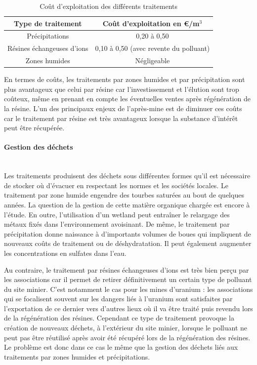 \documentclass{article}
\begin{document}
\begin{table}[H]
    \centering
   \caption{Coût d'exploitation des différents traitements \cite{schick_les_2020}}
    \begin{tabular}{ |c |c |}
        \hline
         \textbf{Type de traitement} & \textbf{Coût d’exploitation en \euro{}/m$^3$} \\ 
         \hline
         Précipitations & 0,20 à 0,50 \\ 
         \hline
         Résines échangeuses d’ions & 0,10 à 0,50 (avec revente du polluant)  \\
         \hline
        Zones humides & Négligeable  \\
         \hline
    \end{tabular}
\label{tab:cout_exploitation_traitements}
\end{table}

En termes de coûts, les traitements par zones humides et par précipitation sont plus avantageux que celui par résine car l’investissement et l’élution sont trop coûteux, même en prenant en compte les éventuelles ventes après régénération de la résine. L’un des principaux enjeux de l’après-mine est de diminuer ces coûts car le traitement par résine est très avantageux lorsque la substance d'intérêt peut être récupérée.

\paragraph{Gestion des déchets \\ \\}

Les traitements produisent des déchets sous différentes formes qu’il est nécessaire de stocker où d’évacuer en respectant les normes et les sociétés locales. Le traitement par zone humide engendre des tourbes saturées au bout de quelques années. La question de la gestion de cette matière organique chargée est encore à l’étude. En outre, l’utilisation d’un wetland peut entraîner le relargage des métaux fixés dans l’environnement avoisinant. De même, le traitement par précipitation donne naissance à d’importants volumes de boues qui impliquent de nouveaux coûts de traitement ou de déshydratation. Il peut également augmenter les concentrations en sulfates dans l’eau. 

Au contraire, le traitement par résines échangeuses d’ions est très bien perçu par les associations car il permet de retirer définitivement un certain type de polluant du site minier. C’est notamment le cas pour les mines d’uranium : les associations qui se focalisent souvent sur les dangers liés à l’uranium sont satisfaites par l’exportation de ce dernier vers d’autres lieux où il va être traité puis revendu lors de la régénération des résines. Cependant ce type de traitement provoque la création de nouveaux déchets, à l’extérieur du site minier, lorsque le polluant ne peut pas être réutilisé après avoir été récupéré lors de la régénération des résines. Le problème est donc dans ce cas le même que la gestion des déchets liés aux traitements par zones humides et précipitations.
\end{document}
